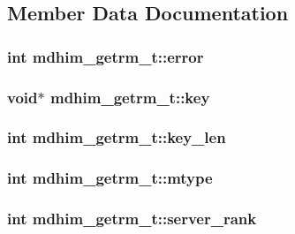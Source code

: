 \subsection{Member Data Documentation}
\hypertarget{structmdhim__getrm__t_ab5a0bbbc5c249097b7ea3c71a8c59be9}{
\subsubsection[{error}]{\setlength{\rightskip}{0pt plus 5cm}int mdhim\-\_\-getrm\-\_\-t\-::error}}\label{d5/dfb/structmdhim__getrm__t_ab5a0bbbc5c249097b7ea3c71a8c59be9}
\hypertarget{structmdhim__getrm__t_a03ac590954131b0bd04b767115b011d2}{
\subsubsection[{key}]{\setlength{\rightskip}{0pt plus 5cm}void$\ast$ mdhim\-\_\-getrm\-\_\-t\-::key}}\label{d5/dfb/structmdhim__getrm__t_a03ac590954131b0bd04b767115b011d2}
\hypertarget{structmdhim__getrm__t_a91f0d874ba5b81f1d22a791f4936653c}{
\subsubsection[{key\-\_\-len}]{\setlength{\rightskip}{0pt plus 5cm}int mdhim\-\_\-getrm\-\_\-t\-::key\-\_\-len}}\label{d5/dfb/structmdhim__getrm__t_a91f0d874ba5b81f1d22a791f4936653c}
\hypertarget{structmdhim__getrm__t_af7c9cb5700c74dae330d00dcb53306a8}{
\subsubsection[{mtype}]{\setlength{\rightskip}{0pt plus 5cm}int mdhim\-\_\-getrm\-\_\-t\-::mtype}}\label{d5/dfb/structmdhim__getrm__t_af7c9cb5700c74dae330d00dcb53306a8}
\hypertarget{structmdhim__getrm__t_ab7e6c3fdb4ba044166a37bf1e178b334}{
\subsubsection[{server\-\_\-rank}]{\setlength{\rightskip}{0pt plus 5cm}int mdhim\-\_\-getrm\-\_\-t\-::server\-\_\-rank}}\label{d5/dfb/structmdhim__getrm__t_ab7e6c3fdb4ba044166a37bf1e178b334}
